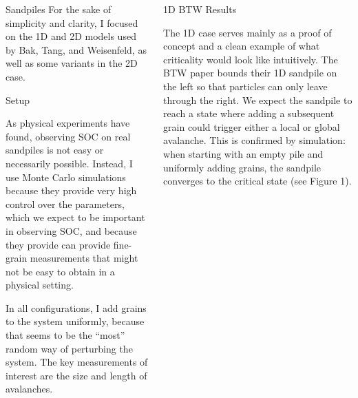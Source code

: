 \documentclass[final]{beamer}
\newlength{\onecolwid}
\begin{document}
\begin{frame}[t]
\begin{columns}[t]
\begin{column}{\onecolwid}
\begin{block}{Sandpiles}
For the sake of simplicity and clarity, I focused on the 1D and 2D models used by Bak, Tang, and Weisenfeld, as well as some variants in the 2D case.

\end{block}


\begin{block}{Setup}

As physical experiments have found, observing SOC on real sandpiles is not easy or necessarily possible. Instead, I use Monte Carlo simulations because they provide very high control over the parameters, which we expect to be important in observing SOC, and because they provide can provide fine-grain measurements that might not be easy to obtain in a physical setting.

In all configurations, I add grains to the system uniformly, because that seems to be the ``most'' random way of perturbing the system. The key measurements of interest are the size and length of avalanches. 


\end{block}


\end{column} %





\begin{column}{\onecolwid} %

\begin{block}{1D BTW Results}

The 1D case serves mainly as a proof of concept and a clean example of what criticality would look like intuitively. The BTW paper bounds their 1D sandpile on the left so that particles can only leave through the right. We expect the sandpile to reach a state where adding a subsequent grain could trigger either a local or global avalanche. This is confirmed by simulation: when starting with an empty pile and uniformly adding grains, the sandpile converges to the critical state (see Figure 1).


\end{block}
\end{column}
\end{columns}
\end{frame}
\end{document}
